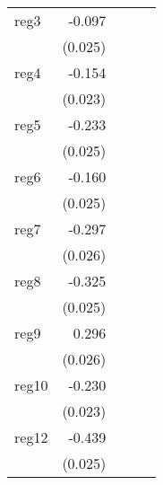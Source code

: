 {\begin{longtable}{l*{4}{D{.}{.}{-1}}}
\addlinespace
reg3        &      -0.097\sym{***}&                     &                     &                     \\
            &     (0.025)         &                     &                     &                     \\
\addlinespace
reg4        &      -0.154\sym{***}&                     &                     &                     \\
            &     (0.023)         &                     &                     &                     \\
\addlinespace
reg5        &      -0.233\sym{***}&                     &                     &                     \\
            &     (0.025)         &                     &                     &                     \\
\addlinespace
reg6        &      -0.160\sym{***}&                     &                     &                     \\
            &     (0.025)         &                     &                     &                     \\
\addlinespace
reg7        &      -0.297\sym{***}&                     &                     &                     \\
            &     (0.026)         &                     &                     &                     \\
\addlinespace
reg8        &      -0.325\sym{***}&                     &                     &                     \\
            &     (0.025)         &                     &                     &                     \\
\addlinespace
reg9        &       0.296\sym{***}&                     &                     &                     \\
            &     (0.026)         &                     &                     &                     \\
\addlinespace
reg10       &      -0.230\sym{***}&                     &                     &                     \\
            &     (0.023)         &                     &                     &                     \\
\addlinespace
reg12       &      -0.439\sym{***}&                     &                     &                     \\
            &     (0.025)         &                     &                     &                     \\

\end{longtable}}
